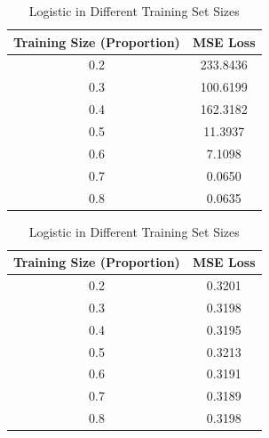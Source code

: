 \documentclass{article}
\begin{document}
\begin{appendices}
\begin{table}[h]
    \centering
    \begin{minipage}{0.45\textwidth}  %
        \centering
        \begin{tabular}{|c|c|}
            \hline
            \textbf{Training Size (Proportion)} & \textbf{MSE Loss} \\
            \hline
            0.2  & 233.8436 \\
            0.3  & 100.6199 \\
            0.4  & 162.3182 \\
            0.5  & 11.3937  \\
            0.6  & 7.1098   \\
            0.7  & 0.0650   \\
            0.8  & 0.0635   \\
            \hline
        \end{tabular}
        \vspace{7pt}
        \caption{Linear in Different Training Set Sizes}
        \label{linear train size}
    \end{minipage}
    \hfill
    \begin{minipage}{0.45\textwidth}  %
        \centering
        \begin{tabular}{|c|c|}
            \hline
            \textbf{Training Size (Proportion)} & \textbf{MSE Loss} \\
            \hline
            0.2  & 0.3201 \\
            0.3  & 0.3198 \\
            0.4  & 0.3195 \\
            0.5  & 0.3213  \\
            0.6  & 0.3191   \\
            0.7  & 0.3189   \\
            0.8  & 0.3198   \\
            \hline
        \end{tabular}
        \vspace{7pt}
        \caption{Logistic in Different Training Set Sizes}
        \label{logistic train size}
    \end{minipage}
\end{table}


\end{appendices}
\end{document}
